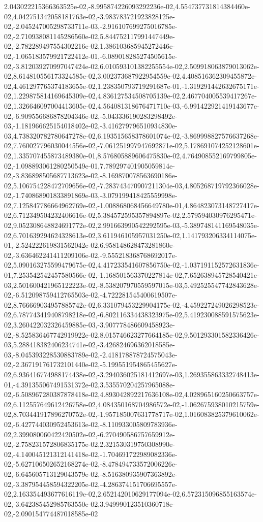 2.043022215366363525e-02,-8.995874226093292236e-02,4.554737731814384460e-02,4.042751342058181763e-02,-3.983783721923828125e-02,-2.045247005298733711e-03,-2.916107699275016785e-02,-2.710938081145286560e-02,5.844752117991447449e-02,-2.782289497554302216e-02,1.386103685945272446e-02,-1.065183579921722412e-01,-6.089018285274505615e-02,-3.812039270997047424e-02,6.010593101382255554e-02,2.509918063879013062e-02,8.614810556173324585e-02,3.002373687922954559e-02,4.408516362309455872e-02,4.461297765374183655e-02,1.238350793719291687e-01,-1.319291442632675171e-02,1.229875814169645309e-02,4.836127534508705139e-02,2.467704005539417267e-02,1.326646097004413605e-02,4.564081318676471710e-03,-6.991422921419143677e-02,-6.909556686878204346e-02,-5.043336190283298492e-03,-1.181966625154018402e-02,-3.416279796510934830e-03,4.738320782780647278e-02,6.193515658378601074e-02,-3.869998827576637268e-02,7.760027796030044556e-02,-7.061251997947692871e-02,5.178691074252128601e-02,1.335707455873489380e-01,8.576805889606475830e-02,4.764908552169799805e-02,-1.098893061280250549e-01,7.789297401905059814e-02,-3.836898505687713623e-02,-8.169870078563690186e-02,5.106754228472709656e-02,-7.283743470907211304e-03,4.805268719792366028e-02,-1.740868901833891869e-03,-3.079199418425559998e-02,7.125847786664962769e-02,-1.008868068456649780e-01,4.864823073148727417e-02,6.712349504232406616e-02,5.384572595357894897e-02,2.579594030976295471e-02,9.052308648824691772e-02,2.991663990542292595e-03,-5.389748141169548035e-02,6.701639294624328613e-02,3.611946105957031250e-02,1.141793206334114075e-01,-2.524222619831562042e-02,6.958148628473281860e-02,-3.636462241411209106e-02,-9.555218368768692017e-02,5.090163275599479675e-02,4.417233541607856750e-02,-1.037191152572631836e-01,7.253542542457580566e-02,-1.168501563370227814e-02,7.652638945728540421e-03,2.501600421965122223e-02,-8.538207970559597015e-03,5.492525547742843628e-02,-6.512098759412765503e-02,-4.722281545400619507e-02,8.766669034957885742e-02,6.331079453229904175e-02,-4.459227249026298523e-02,6.787743419408798218e-02,-6.802116334438323975e-02,5.419230088591575623e-02,3.260422032326459885e-03,-3.907778486609458923e-02,-8.525836467742919922e-02,8.015746623277664185e-02,9.501293301582336426e-03,5.288418382406234741e-02,-3.426824696362018585e-03,-8.045393228530883789e-02,-2.418178878724575043e-02,-2.367191761732101440e-02,-5.199551954865455627e-02,6.936416774988174438e-02,-3.294036025181412697e-03,1.269355863332748413e-01,-4.391355067491531372e-02,3.535570204257965088e-02,-6.508967280387878418e-02,4.893042892217636108e-02,4.028965160250663757e-02,6.112557649612426758e-02,4.084350168704986572e-02,-1.062675938010215759e-02,8.703441917896270752e-02,-1.957185007631778717e-02,1.016083825379610062e-02,-6.427744030952453613e-02,-8.110933005809783936e-02,2.399080060422420502e-02,-6.270490586757659912e-02,-2.758231572806835175e-02,2.321530319750308990e-02,-4.140045121312141418e-02,-1.704691722989082336e-02,-5.627106502652168274e-02,-8.478494733572006226e-02,-6.645605713129043579e-02,-8.516380935907363892e-02,-3.387954458594322205e-02,-4.286374151706695557e-02,2.163354493677616119e-02,2.652142010629177094e-02,6.572315096855163574e-02,-3.642385452985763550e-02,3.949990123510360718e-02,-2.090154774487018585e-02
